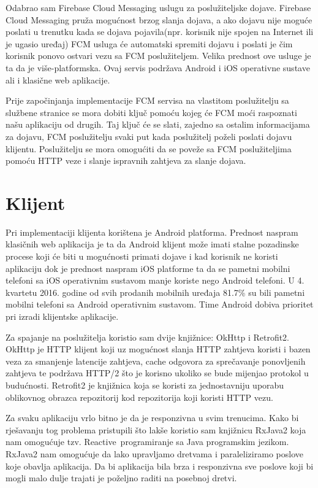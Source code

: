\documentclass[times, utf8, zavrsni]{fer}
\begin{document}
{Odabrao sam Firebase Cloud Messaging uslugu za poslužiteljske dojave. Firebase Cloud Messaging pruža mogućnost brzog slanja dojava, a ako dojavu nije moguće poslati u trenutku kada se dojava pojavila(npr. korisnik nije spojen na Internet ili je ugasio uređaj) FCM usluga će automatski spremiti dojavu i poslati je čim korisnik ponovo ostvari vezu sa FCM poslužiteljem. Velika prednost ove usluge je ta da je više-platformska. Ovaj servis podržava Android i iOS operativne sustave ali i klasične web aplikacije.

Prije započinjanja implementacije FCM servisa na vlastitom poslužitelju sa službene stranice se mora dobiti ključ pomoću kojeg će FCM moći raspoznati našu aplikaciju od drugih. Taj ključ će se slati, zajedno sa ostalim informacijama za dojavu, FCM poslužitelju svaki put kada poslužitelj poželi poslati dojavu klijentu. Poslužitelju se mora omogućiti da se poveže sa FCM poslužiteljima pomoću HTTP veze i slanje ispravnih zahtjeva za slanje dojava.

\section{Klijent}
Pri implementaciji klijenta korištena je Android platforma. Prednost naspram klasičnih web aplikacija je ta da Android klijent može imati stalne pozadinske procese koji će biti u mogućnosti primati dojave i kad korisnik ne koristi aplikaciju dok je prednost naspram iOS platforme ta da se pametni mobilni telefoni sa iOS operativnim sustavom manje koriste nego Android telefoni. U 4. kvartetu 2016. godine od svih prodanih mobilnih uređaja 81.7\% \citep{vincent2017} su bili pametni mobilni telefoni sa Android operativnim sustavom. Time Android dobiva prioritet pri izradi klijentske aplikacije.

Za spajanje na poslužitelja koristio sam dvije knjižnice: OkHttp i Retrofit2. OkHttp je HTTP klijent koji uz mogućnost slanja HTTP zahtjeva koristi i bazen veza za smanjenje latencije zahtjeva, cache odgovora za sprečavanje ponovljenih zahtjeva te podržava HTTP/2 što je korisno ukoliko se bude mijenjao protokol u budućnosti. Retrofit2 je knjižnica koja se koristi za jednostavniju uporabu oblikovnog obrazca repozitorij kod repozitorija koji koristi HTTP vezu.

Za svaku aplikaciju vrlo bitno je da je responzivna u svim trenucima. Kako bi rješavanju tog problema pristupili što lakše koristio sam knjižnicu RxJava2 koja nam omogućuje tzv. \glqq Reactive\grqq\  programiranje sa Java programskim jezikom. RxJava2 nam omogućuje da lako upravljamo dretvama i paraleliziramo poslove koje obavlja aplikacija. Da bi aplikacija bila brza i responzivna sve poslove koji bi mogli malo dulje trajati je poželjno raditi na posebnoj dretvi.

}
\end{document}

